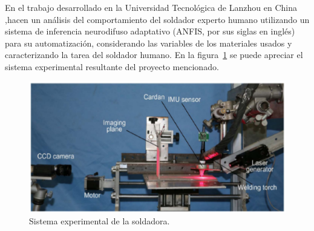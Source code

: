 
En el trabajo desarrollado en la Universidad Tecnol\'ogica de Lanzhou en China
 \cite{Zhang2017},hacen un an\'alisis del comportamiento del soldador experto
 humano utilizando un sistema de inferencia neurodifuso adaptativo (ANFIS,
 por sus siglas en ingl\'es) para su automatizaci\'on, considerando las
 variables
 de los materiales usados y caracterizando la tarea del soldador humano.
 En la figura~\ref{fig:syswelding} se puede apreciar el sistema experimental
  resultante del proyecto mencionado.


\begin{figure}[h]
\centering
\includegraphics[width=0.8\columnwidth]{chap2/Imagenes/Welding.eps}
\caption{Sistema experimental de la soldadora\cite{Zhang2017}.}
\label{fig:syswelding}
\end{figure} 
 